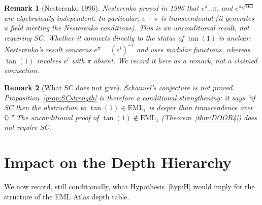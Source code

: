 \documentclass[11pt]{article}
\newtheorem{remark}{Remark}
\newcommand{\EML}[1]{\mathrm{EML}_{#1}}
\begin{document}
\begin{remark}[Nesterenko 1996]
Nesterenko proved in 1996 that $e^{\pi}$, $\pi$, and $e^{\pi\sqrt{163}}$ are
algebraically independent.  In particular, $e + \pi$ is transcendental (it
generates a field meeting the Nesterenko conditions).  This is an
\emph{unconditional} result, not requiring SC.  Whether it connects directly
to the status of $\tan(1)$ is unclear: Nesterenko's result concerns
$e^{\pi} = (e^{i})^{-i}$ and uses modular functions, whereas $\tan(1)$
involves $e^i$ with $\pi$ absent.  We record it here as a remark, not a
claimed connection.
\end{remark}

\begin{remark}[What SC does not give]
Schanuel's conjecture is not proved.  Proposition~\ref{prop:SCstrength} is
therefore a \emph{conditional strengthening}: it says ``if SC then the
obstruction to $\tan(1) \in \EML{1}$ is deeper than transcendence over
$\mathbb{Q}$.''  The unconditional proof of $\tan(1) \notin \EML{1}$
(Theorem~\ref{thm:DOOR4}) does not require SC.
\end{remark}

\section{Impact on the Depth Hierarchy}

We now record, still conditionally, what Hypothesis~\ref{hyp:H} would imply
for the structure of the EML Atlas depth table.
\end{document}

